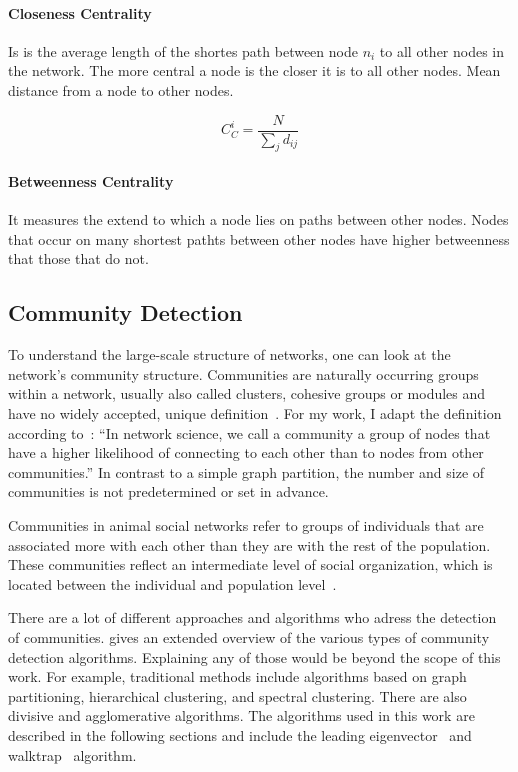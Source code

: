 \paragraph{Closeness Centrality}
Is is the average length of the shortes path between node $n_i$ to all other nodes in the network. The more central a node is the closer it is to all other nodes. Mean distance from a node to other nodes.~\cite{newman2010networks}

$$C_C^i=\frac{N}{\sum_{j}d_{ij}}$$

\paragraph{Betweenness Centrality}
It measures the extend to which a node lies on paths between other nodes. Nodes that occur on many shortest pathts between other nodes have higher betweenness that those that do not.


\subsection{Community Detection}
\label{subsec:bg:communities}
To understand the large-scale structure of networks, one can look at the network's community structure. Communities are naturally occurring groups within a network, usually also called clusters, cohesive groups or modules and have no widely accepted, unique definition~\cite{palla2005uncovering}.
For my work, I adapt the definition according to~\textcite[p. 322]{barabasi2016network}: 
``In network science, we call a community a group of nodes that have a higher likelihood of connecting to each other than to nodes from other communities.'' In contrast to a simple graph partition, the number and size of communities is not predetermined or set in advance.

Communities in animal social networks refer to groups of individuals that are associated more with each other than they are with the rest of the population. These communities reflect an intermediate level of social organization, which is located between the individual and population level~\cite{croft2008exploring}.

There are a lot of different approaches and algorithms who adress the detection of communities. \textcite{fortunato2010community} gives an extended overview of the various types of community detection algorithms.
Explaining any of those would be beyond the scope of this work. For example, traditional methods include algorithms based on graph partitioning, hierarchical clustering, and spectral clustering. There are also divisive and agglomerative algorithms.
The algorithms used in this work are described in the following sections and include the leading eigenvector~\cite{newman2006finding} and walktrap~\cite{pons2005computing} algorithm.


